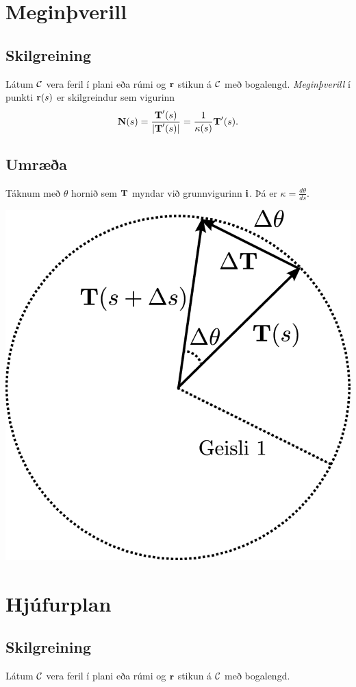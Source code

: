 \documentclass[a4paper,10pt,icelandic]{sphinxmanual}
\begin{document}
\section{Meginþverill}
\label{Kafli1:meginverill}

\subsection{Skilgreining}
\label{Kafli1:id16}\label{Kafli1:index-16}
Látum \(\cal C\) vera feril í plani eða rúmi og
\(\mbox{${\bf r}$}\) stikun á \(\cal C\) með bogalengd.
\textit{Meginþverill} í punkti
\(\mbox{${\bf r}$}(s)\) er skilgreindur sem vigurinn
\begin{gather}
\begin{split}\displaystyle \mbox{${\bf N}$}(s)=\frac{\mbox{${\bf T}$}'(s)}{|\mbox{${\bf T}$}'(s)|}=\frac{1}{\kappa(s)}\mbox{${\bf T}$}'(s).\end{split}\notag
\end{gather}

\subsection{Umræða}
\label{Kafli1:umraea}
Táknum með \(\theta\) hornið sem \(\mbox{${\bf T}$}\) myndar við
grunnvigurinn \(\mbox{${\bf i}$}\). Þá er
\(\kappa = \frac{d\theta}{ds}\).

{\hfill\includegraphics[width=0.400\linewidth]{krappi.png}\hfill}


\section{Hjúfurplan}
\label{Kafli1:hjufurplan}

\subsection{Skilgreining}
\label{Kafli1:index-17}\label{Kafli1:id17}
Látum \(\cal C\) vera feril í plani eða rúmi og
\(\mbox{${\bf r}$}\) stikun á \(\cal C\) með bogalengd.
\end{document}
